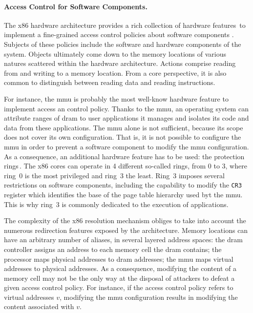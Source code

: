 \paragraph{Access Control for Software Components.}
%
The x86 hardware architecture provides a rich collection of hardware
features\,\cite[Chapter 3]{intel2014manual} to implement a fine-grained access
control policies about software components \IOs.
%
Subjects of these policies include the software and hardware components of the
system.
%
Objects ultimately come down to the memory locations of various natures
scattered within the hardware architecture.
%
Actions comprise reading from and writing to a memory location. From a core
perspective, it is also common to distinguish between reading data and reading
instructions.

For instance, the \ac{mmu} is probably the most well-know hardware feature to
implement access an control policy.
%
Thanks to the \ac{mmu}, an operating system can attribute ranges of \ac{dram} to
user applications it manages and isolates its code and data from these
applications.
%
The \ac{mmu} alone is not sufficient, because its scope does not cover its own
configuration.
%
That is, it is not possible to configure the \ac{mmu} in order to prevent a
software component to modify the \ac{mmu} configuration.
%
As a consequence, an additional hardware feature has to be used: the protection
rings\,\cite[Volume 3, Section 5.5]{intel2014manual}.
%
The x86 cores can operate in 4 different so-called rings, from 0 to 3, where
ring~0 is the most privileged and ring~3 the least.
%
Ring~3 imposes several restrictions on software components, including the
capability to modify the \texttt{CR3} register which identifies the base of the
page table hierarchy used byt the \ac{mmu}.
%
This is why ring~3 is commonly dedicated to the execution of applications.

%
%

The complexity of the x86 \IO resolution mechanism obliges to take into account
the numerous redirection features exposed by the architecture.
%
Memory locations can have an arbitrary number of aliases, in several layered
address spaces: the \ac{dram} controller assigns an address to each memory cell
the \ac{dram} contains; the processor maps physical addresses to \ac{dram}
addresses; the \ac{mmu} maps virtual addresses to physical addresses.
%
As a consequence, modifying the content of a memory cell may not be the only way
at the disposal of attackers to defeat a given access control policy.
%
For instance, if the access control policy refers to virtual addresses \( v \),
modifying the \ac{mmu} configuration results in modifying the content associated
with \( v \).

